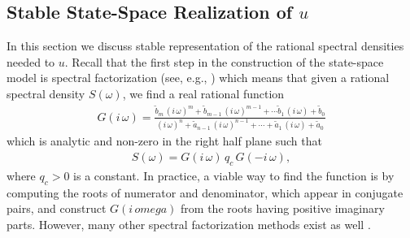 \documentclass[journal]{IEEEtran}
\begin{document}
\subsection{Stable State-Space Realization of $u$}
%
In this section we discuss stable representation of the rational spectral densities needed to $u$. Recall that the first step in the construction of the state-space model is spectral factorization (see, e.g., \cite{Hartikainen+Sarkka:2010, Sarkka+Hartikainen:2012, Sarkka+Solin+Hartikainen:2013}) which means that given a rational spectral density $S(\omega)$, we find a real rational function
%
\begin{equation}
\begin{split}
 G(i \, \omega)
 = \frac{\tilde{b}_m \, (i \, \omega)^m + \tilde{b}_{m-1} \, (i \, \omega)^{m-1} + \cdots
   \tilde{b}_1 \, (i \, \omega) + \tilde{b}_0}
   {(i \, \omega)^n + \tilde{a}_{n-1} \, (i \, \omega)^{n-1} + \cdots + \tilde{a}_1 \, (i \, \omega) + \tilde{a}_0}
\end{split}
\label{eq:trans2}
\end{equation}
%
which is analytic and non-zero in the right half plane such that
%
\begin{equation}
\begin{split}
  S(\omega) = G(i \, \omega) \, q_c \, G(-i \, \omega),
\end{split}
\end{equation}
%
where $q_c > 0$ is a constant. In practice, a viable way to find the function is by computing the roots of numerator and denominator, which appear in conjugate pairs, and construct $G(i \, omega)$ from the roots having positive imaginary parts. However, many other spectral factorization methods exist as well \cite{Ref-to-spec-fact-survey}.
\end{document}

